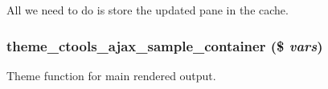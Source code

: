 All we need to do is store the updated pane in the cache. \hypertarget{ctools__ajax__sample_8module_a3c08fd36574f336a7ac1c374bf7a8ea5}{
\subsubsection[{theme\_\-ctools\_\-ajax\_\-sample\_\-container}]{\setlength{\rightskip}{0pt plus 5cm}theme\_\-ctools\_\-ajax\_\-sample\_\-container (\$ {\em vars})}}
\label{ctools__ajax__sample_8module_a3c08fd36574f336a7ac1c374bf7a8ea5}
Theme function for main rendered output. 